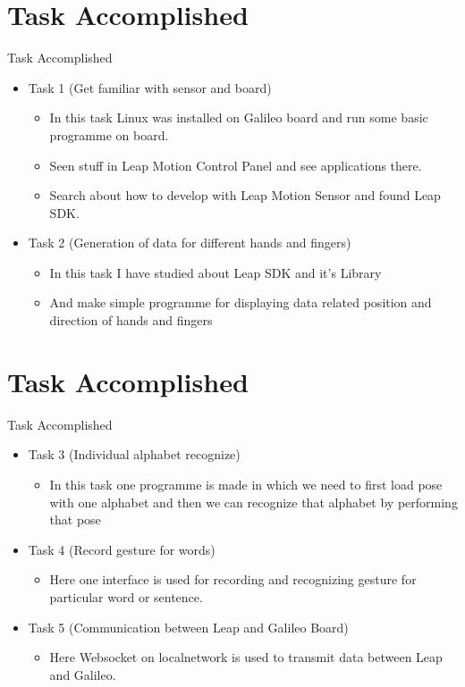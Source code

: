\documentclass[10pt, a4paper]{beamer}
\begin{document}
\section{Task Accomplished}
\begin{frame}{Task Accomplished}
	\begin{itemize}
		\item Task 1 (Get familiar with sensor and board)
		\begin{itemize}
		    \item In this task Linux was installed on Galileo board and run some basic programme on board.
		    \item Seen stuff in Leap Motion Control Panel and see applications there.
		    \item Search about how to develop with Leap Motion Sensor and found Leap SDK.
		\end{itemize}
		\item Task 2 (Generation of data for different hands and fingers)
		\begin{itemize}
		    \item In this task I have studied about Leap SDK and it's Library 
		    \item And make simple programme for displaying  data related position and direction of hands and fingers
		\end{itemize}
	\end{itemize}
\end{frame}
\section{Task Accomplished}
\begin{frame}{Task Accomplished}
    \begin{itemize}
        \item Task 3 (Individual alphabet recognize)
		\begin{itemize}
		    \item In this task one programme is made in which we need to first load pose with one alphabet and then we can recognize that alphabet by performing that pose
		\end{itemize}
		\item Task 4 (Record gesture for words)
		\begin{itemize}
		    \item Here one interface is used for recording and recognizing gesture for particular word or sentence.
		\end{itemize}
		\item Task 5 (Communication between Leap and Galileo Board)
		\begin{itemize}
		    \item Here Websocket on localnetwork is used to transmit data between Leap and Galileo. 
		\end{itemize}
	\end{itemize}
\end{frame}
\end{document}
